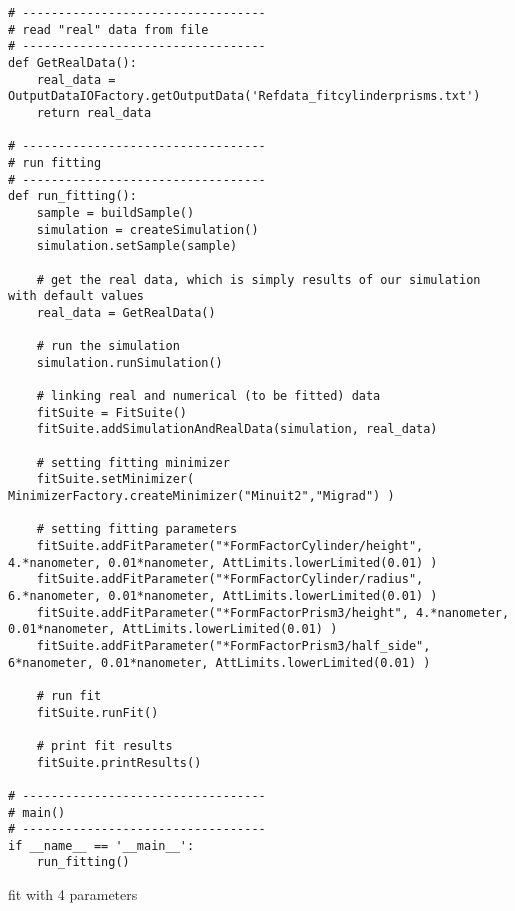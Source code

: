 \begin{lstlisting}
# ----------------------------------
# read "real" data from file
# ----------------------------------
def GetRealData():
    real_data = OutputDataIOFactory.getOutputData('Refdata_fitcylinderprisms.txt')
    return real_data

# ----------------------------------
# run fitting 
# ----------------------------------
def run_fitting():
    sample = buildSample()
    simulation = createSimulation()
    simulation.setSample(sample)

    # get the real data, which is simply results of our simulation with default values
    real_data = GetRealData()
    
    # run the simulation
    simulation.runSimulation()
    
    # linking real and numerical (to be fitted) data
    fitSuite = FitSuite()
    fitSuite.addSimulationAndRealData(simulation, real_data)
    
    # setting fitting minimizer
    fitSuite.setMinimizer( MinimizerFactory.createMinimizer("Minuit2","Migrad") ) 
  
    # setting fitting parameters
    fitSuite.addFitParameter("*FormFactorCylinder/height", 4.*nanometer, 0.01*nanometer, AttLimits.lowerLimited(0.01) )
    fitSuite.addFitParameter("*FormFactorCylinder/radius", 6.*nanometer, 0.01*nanometer, AttLimits.lowerLimited(0.01) )
    fitSuite.addFitParameter("*FormFactorPrism3/height", 4.*nanometer, 0.01*nanometer, AttLimits.lowerLimited(0.01) )
    fitSuite.addFitParameter("*FormFactorPrism3/half_side", 6*nanometer, 0.01*nanometer, AttLimits.lowerLimited(0.01) )

    # run fit
    fitSuite.runFit()
    
    # print fit results
    fitSuite.printResults()

# ----------------------------------
# main()
# ----------------------------------
if __name__ == '__main__':
    run_fitting()

\end{lstlisting}


\newpage

fit with 4 parameters


